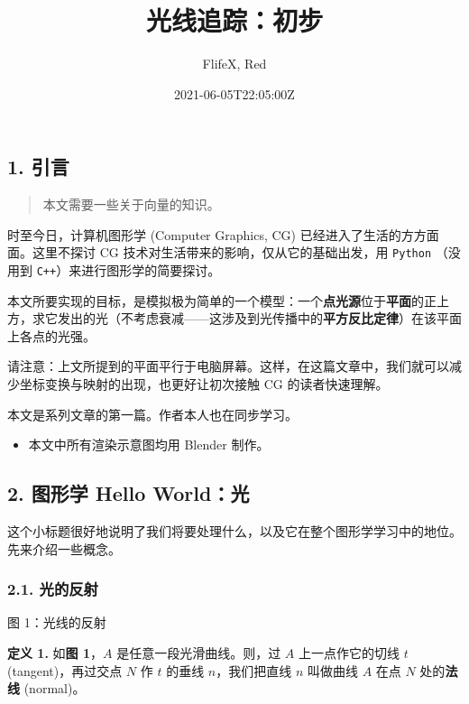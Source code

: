 \documentclass[
]{article}
\title{光线追踪：初步}
\author{FlifeX, Red}
\date{2021-06-05T22:05:00Z}
\begin{document}
\maketitle

\hypertarget{1-ux5f15ux8a00}{%
\subsection{1. 引言}\label{1-ux5f15ux8a00}}

\begin{quote}
本文需要一些关于向量的知识。
\end{quote}

时至今日，计算机图形学 (Computer Graphics, CG)
已经进入了生活的方方面面。这里不探讨 CG
技术对生活带来的影响，仅从它的基础出发，用 \texttt{Python} （没用到
\texttt{C++}）来进行图形学的简要探讨。

本文所要实现的目标，是模拟极为简单的一个模型：一个\textbf{点光源}位于\textbf{平面}的正上方，求它发出的光（不考虑衰减------这涉及到光传播中的\textbf{平方反比定律}）在该平面上各点的光强。

请注意：上文所提到的平面平行于电脑屏幕。这样，在这篇文章中，我们就可以减少坐标变换与映射的出现，也更好让初次接触
CG 的读者快速理解。

本文是系列文章的第一篇。作者本人也在同步学习。

\begin{itemize}
\item
  本文中所有渲染示意图均用 Blender 制作。
\end{itemize}

\hypertarget{2-ux56feux5f62ux5b66-hello-worldux5149}{%
\subsection{2. 图形学 Hello
World：光}\label{2-ux56feux5f62ux5b66-hello-worldux5149}}

这个小标题很好地说明了我们将要处理什么，以及它在整个图形学学习中的地位。先来介绍一些概念。

\hypertarget{21-ux5149ux7684ux53cdux5c04}{%
\subsubsection{2.1. 光的反射}\label{21-ux5149ux7684ux53cdux5c04}}

    

 图 1：光线的反射 

\textbf{定义 1.} 如\textbf{图 1}，\(A\) 是任意一段光滑曲线。则，过 \(A\)
上一点作它的切线 \(t\) (tangent)，再过交点 \(N\) 作 \(t\) 的垂线
\(n\)，我们把直线 \(n\) 叫做曲线 \(A\) 在点 \(N\) 处的\textbf{法线}
(normal)。
\end{document}
